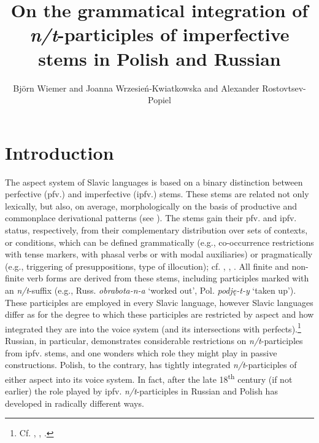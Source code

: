\documentclass[output=paper]{langscibook}
\author{Björn Wiemer\affiliation{Johannes Gutenberg University Mainz} and Joanna Wrzesień-Kwiatkowska\affiliation{Johannes Gutenberg University Mainz} and Alexander Rostovtsev-Popiel \affiliation{Johannes Gutenberg University Mainz}}
\title[On the grammatical integration of \emph{n/t}-participles
of imperfective stems]{On the grammatical integration of \emph{n/t}-participles
of imperfective stems in Polish and Russian}
\begin{document}

\maketitle

\section{Introduction}\label{wiem:sec:intro}
\begin{sloppypar}
The aspect system of Slavic languages is based on a binary distinction between perfective (pfv.) and imperfective (ipfv.) stems. These stems are related not only lexically, but also, on average, morphologically on the basis of productive and commonplace derivational patterns (see ). The stems gain their pfv. and ipfv. status, respectively, from their complementary distribution over sets of contexts, or conditions, which can be defined grammatically (e.g., co-occurrence restrictions with tense markers, with phasal verbs or with modal auxiliaries) or pragmatically (e.g., triggering of presuppositions, type of illocution); cf. \citet{Wiemer2008}, \citet[243--255]{Wiemer.Seržant2017}, \citet[\S\S2--3]{Wiemer.Wrzesień-Kwiatkowska.Wyroślak2020}. All finite and non-finite verb forms are derived from these stems, including participles marked with an \textit{n/t}-suffix (e.g., Russ. \textit{obrabota-n-a} ‘worked out’, Pol. \textit{podję-t-y} ‘taken up’). These participles are employed in every Slavic language, however Slavic languages differ as for the degree to which these participles are restricted by aspect and how integrated they are into the voice system (and its intersections with perfects).\footnote{Cf. \citet{WiemerGiger2005}, \citet{Wiemer2017}, \citet{Arkadiev.Wiemer2020}.} Russian, in particular, demonstrates considerable restrictions on \textit{n/t}-participles from ipfv. stems, and one wonders which role they might play in passive constructions. Polish, to the contrary, has tightly integrated \textit{n/t}-participles of either aspect into its voice system. In fact, after the late 18\textsuperscript{th} century (if not earlier) the role played by ipfv. \textit{n/t}-participles in Russian and Polish has developed in radically different ways.
\end{sloppypar}
\end{document}
